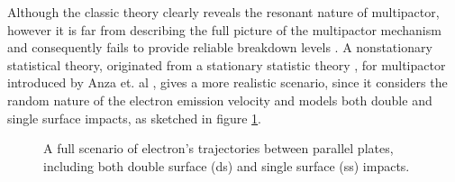 \documentclass[a4paper,11pt]{article}
\begin{document}
Although the classic theory clearly reveals the resonant nature of multipactor, however it is far from describing the full picture of the multipactor mechanism and consequently fails to provide reliable breakdown levels \cite{NS}. A nonstationary statistical theory, originated from a stationary statistic theory \cite{ST}, for multipactor introduced by Anza et. al \cite{NS}, gives a more realistic scenario, since it considers the random nature of the electron emission velocity and models both double and single surface impacts, as sketched in figure \ref{fig:ss-ds}.
\begin{figure}[H]
\begin{center}

\end{center}
\caption{ A full scenario of electron's trajectories between parallel plates, including both double surface (ds) and single surface (ss) impacts. \cite{NS}\label{fig:ss-ds}}
\end{figure}
\end{document}
